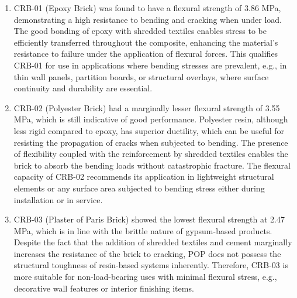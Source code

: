 \begin{enumerate}
	\item CRB-01 (Epoxy Brick) was found to have a flexural strength of 3.86 MPa, demonstrating a high resistance to bending and cracking when under load. The good bonding of epoxy with shredded textiles enables stress to be efficiently transferred throughout the composite, enhancing the material's resistance to failure under the application of flexural forces. This qualifies CRB-01 for use in applications where bending stresses are prevalent, e.g., in thin wall panels, partition boards, or structural overlays, where surface continuity and durability are essential.
	\item CRB-02 (Polyester Brick) had a marginally lesser flexural strength of 3.55 MPa, which is still indicative of good performance. Polyester resin, although less rigid compared to epoxy, has superior ductility, which can be useful for resisting the propagation of cracks when subjected to bending. The presence of flexibility coupled with the reinforcement by shredded textiles enables the brick to absorb the bending loads without catastrophic fracture. The flexural capacity of CRB-02 recommends its application in lightweight structural elements or any surface area subjected to bending stress either during installation or in service.
	\item CRB-03 (Plaster of Paris Brick) showed the lowest flexural strength at 2.47 MPa, which is in line with the brittle nature of gypsum-based products. Despite the fact that the addition of shredded textiles and cement marginally increases the resistance of the brick to cracking, POP does not possess the structural toughness of resin-based systems inherently. Therefore, CRB-03 is more suitable for non-load-bearing uses with minimal flexural stress, e.g., decorative wall features or interior finishing items.
\end{enumerate}

